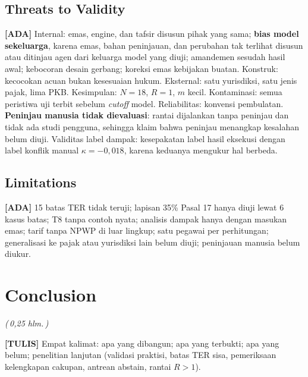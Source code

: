 \documentclass{ieeeaccess}
\newcommand{\ADA}{\textcolor{stada}{\textbf{[ADA]}}}
\newcommand{\TULIS}{\textcolor{sttulis}{\textbf{[TULIS]}}}
\newcommand{\hal}[1]{\textcolor{draftblue}{\textit{(\,#1 hlm.\,)}}}
\newenvironment{isi}{\par\smallskip\footnotesize\color{draftblue}\noindent}{\par\smallskip\normalsize\color{black}}
\begin{document}
\subsection{Threats to Validity}
\begin{isi}
\ADA{} Internal: emas, engine, dan tafsir disusun pihak yang sama; \textbf{bias model sekeluarga}, karena emas, bahan peninjauan, dan perubahan tak terlihat disusun atau ditinjau agen dari keluarga model yang diuji; amandemen sesudah hasil awal; kebocoran desain gerbang; koreksi emas kebijakan buatan. Konstruk: kecocokan acuan bukan kesesuaian hukum. Eksternal: satu yurisdiksi, satu jenis pajak, lima PKB. Kesimpulan: $N = 18$, $R = 1$, $m$ kecil. Kontaminasi: semua peristiwa uji terbit sebelum \textit{cutoff} model. Reliabilitas: konvensi pembulatan. \textbf{Peninjau manusia tidak dievaluasi}: rantai dijalankan tanpa peninjau dan tidak ada studi pengguna, sehingga klaim bahwa peninjau menangkap kesalahan belum diuji. Validitas label dampak: kesepakatan label hasil eksekusi dengan label konflik manual $\kappa = -0{,}018$, karena keduanya mengukur hal berbeda.
\end{isi}

\subsection{Limitations}
\begin{isi}
\ADA{} 15 batas TER tidak teruji; lapisan 35\% Pasal 17 hanya diuji lewat 6 kasus batas; T8 tanpa contoh nyata; analisis dampak hanya dengan masukan emas; tarif tanpa NPWP di luar lingkup; satu pegawai per perhitungan; generalisasi ke pajak atau yurisdiksi lain belum diuji; peninjauan manusia belum diukur.
\end{isi}

\section{Conclusion}
\label{sec:simpulan}
\hal{0,25}
\begin{isi}
\TULIS{} Empat kalimat: apa yang dibangun; apa yang terbukti; apa yang belum; penelitian lanjutan (validasi praktisi, batas TER sisa, pemeriksaan kelengkapan cakupan, antrean abstain, rantai $R > 1$).
\end{isi}

\end{document}

